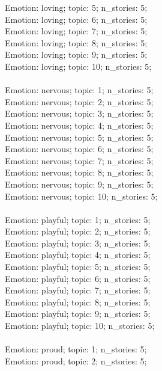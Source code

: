 \begin{anthropicbox}
    Emotion: loving; topic: 5; n\_stories: 5;\\
    Emotion: loving; topic: 6; n\_stories: 5;\\
    Emotion: loving; topic: 7; n\_stories: 5;\\
    Emotion: loving; topic: 8; n\_stories: 5;\\
    Emotion: loving; topic: 9; n\_stories: 5;\\
    Emotion: loving; topic: 10; n\_stories: 5;
    \\\\
    Emotion: nervous; topic: 1; n\_stories: 5;\\
    Emotion: nervous; topic: 2; n\_stories: 5;\\
    Emotion: nervous; topic: 3; n\_stories: 5;\\
    Emotion: nervous; topic: 4; n\_stories: 5;\\
    Emotion: nervous; topic: 5; n\_stories: 5;\\
    Emotion: nervous; topic: 6; n\_stories: 5;\\
    Emotion: nervous; topic: 7; n\_stories: 5;\\
    Emotion: nervous; topic: 8; n\_stories: 5;\\
    Emotion: nervous; topic: 9; n\_stories: 5;\\
    Emotion: nervous; topic: 10; n\_stories: 5;
    \\\\
    Emotion: playful; topic: 1; n\_stories: 5;\\
    Emotion: playful; topic: 2; n\_stories: 5;\\
    Emotion: playful; topic: 3; n\_stories: 5;\\
    Emotion: playful; topic: 4; n\_stories: 5;\\
    Emotion: playful; topic: 5; n\_stories: 5;\\
    Emotion: playful; topic: 6; n\_stories: 5;\\
    Emotion: playful; topic: 7; n\_stories: 5;\\
    Emotion: playful; topic: 8; n\_stories: 5;\\
    Emotion: playful; topic: 9; n\_stories: 5;\\
    Emotion: playful; topic: 10; n\_stories: 5;
    \\\\
    Emotion: proud; topic: 1; n\_stories: 5;\\
    Emotion: proud; topic: 2; n\_stories: 5;\\

\end{anthropicbox}
